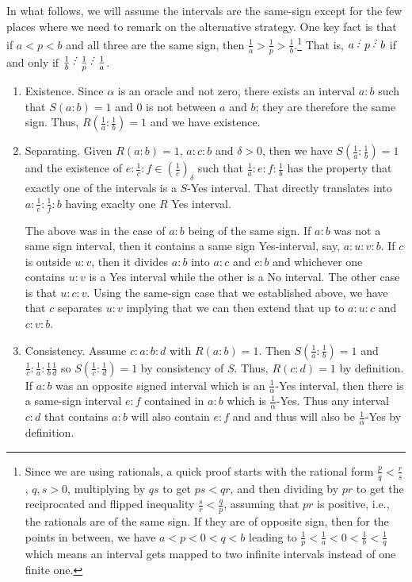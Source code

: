 \documentclass[12pt]{article}
\begin{document}
\begin{itemize}
    In what follows, we will assume the intervals are the same-sign except for the few places where we need to remark on the alternative strategy. One key fact is that if $a<p<b$ and all three are the same sign, then $\frac{1}{a} > \frac{1}{p} > \frac{1}{b}$.\footnote{Since we are using rationals, a quick proof starts with the rational form $\frac{p}{q} < \frac{r}{s}$, $q, s > 0$, multiplying by $qs$ to get $ps < qr$, and then dividing by $pr$ to get the reciprocated and flipped inequality $\frac{s}{r} < \frac{q}{p}$, assuming that $pr$ is positive, i.e., the rationals are of the same sign. If they are of opposite sign, then for the points in between, we have $a < p < 0< q< b$ leading to $\frac{1}{p} < \frac{1}{a} < 0 < \frac{1}{b} < \frac{1}{q}$ which means an interval gets mapped to two infinite intervals instead of one finite one.} That is, $a\lte p\lte b$ if and only if $\frac{1}{b} \lte \frac{1}{p}\lte \frac{1}{a}$.
    
    \begin{enumerate}
        
        \item Existence. Since $\alpha$ is an oracle and not zero, there exists an interval $a:b$ such that $S(a:b)=1$ and 0 is not between $a$ and $b$; they are therefore the same sign. Thus, $R(\frac{1}{a}:\frac{1}{b})=1$ and we have existence. 
        \item Separating. Given $R(a:b)=1$, $a:c:b$ and $\delta > 0$, then we have $S(\frac{1}{a}:\frac{1}{b})=1$ and the existence of $e:\frac{1}{c}:f \in (\frac{1}{c})_\delta$ such that $\frac{1}{a}:e:f:\frac{1}{b}$ has the property that exactly one of the intervals is a $S$-Yes interval. That directly translates into $a:\frac{1}{e}:\frac{1}{f}:b$ having exaclty one $R$ Yes interval. 
        
        The above was in the case of $a:b$ being of the same sign. If $a:b$ was not a same sign interval, then it contains a same sign Yes-interval, say, $a:u:v:b$. If $c$ is outside $u:v$, then it divides $a:b$ into $a:c$ and $c:b$ and whichever one contains $u:v$ is a Yes interval while the other is a No interval. The other case is that $u:c:v$. Using the same-sign case that we established above, we have that $c$ separates $u:v$ implying that we can then extend that up to $a:u:c$ and $c:v:b$.
        \item Consistency. Assume $c: a: b: d $ with $R(a:b)=1$. Then $S(\frac{1}{a}:\frac{1}{b}) = 1$ and $\frac{1}{c}:\frac{1}{a}:\frac{1}{b}\frac{1}{d}$ so $S(\frac{1}{c}:\frac{1}{d})=1$ by consistency of $S$. Thus, $R(c:d) = 1$ by definition. If $a:b$ was an opposite signed interval which is an $\frac{1}{\alpha}$-Yes interval, then there is a same-sign interval $e:f$ contained in $a:b$ which is $\frac{1}{\alpha}$-Yes. Thus any interval $c:d$ that contains $a:b$ will also contain $e:f$ and and thus will also be $\frac{1}{\alpha}$-Yes by definition. 


\end{enumerate}
\end{itemize}
\end{document}
